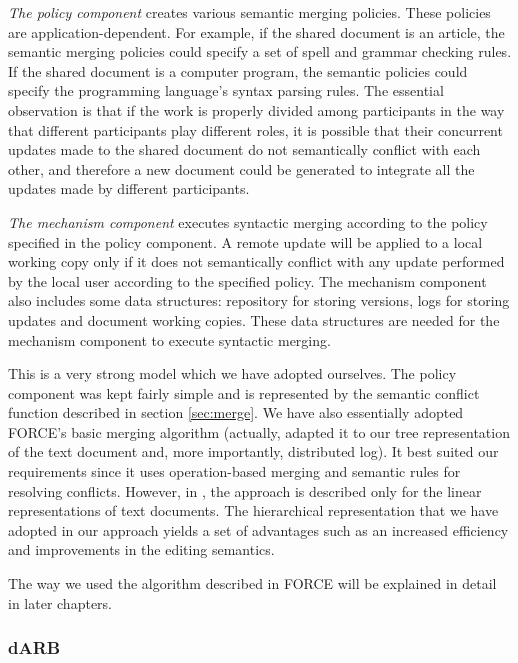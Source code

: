 \emph{The policy component} creates various semantic merging policies. These policies are
application-dependent. For example, if the shared document is an article, the semantic merging
policies could specify a set of spell and grammar checking rules. If the shared document is a
computer program, the semantic policies could specify the programming language's syntax parsing
rules. The essential observation is that if the work is properly divided among participants
in the way that different participants play different roles, it is possible that their concurrent
updates made to the shared document do not semantically conflict with each other, and therefore
a new document could be generated to integrate all the updates made by different participants.

\emph{The mechanism component} executes syntactic merging according to the policy specified in the
policy component. A remote update will be applied to a local working copy only if it does not
semantically conflict with any update performed by the local user according to the specified
policy. The mechanism component also includes some data structures: repository for storing versions,
logs for storing updates and document working copies. These data structures are needed for the
mechanism component to execute syntactic merging.

This is a very strong model which we have adopted ourselves. The policy component was kept fairly
simple and is represented by the semantic conflict function described in section \ref{sec:merge}.
We have also essentially adopted FORCE's basic merging algorithm (actually, adapted it to our
tree representation of the text document and, more importantly, distributed log). It best suited
our requirements since it uses operation-based merging and semantic rules for resolving conflicts.
However, in \cite{shen02}, the approach is described only for the linear representations of text
documents. The hierarchical representation that we have adopted in our approach yields a set of
advantages such as an increased efficiency and improvements in the editing semantics.

The way we used the algorithm described in FORCE will be explained in detail in later chapters.

\subsubsection{dARB}

